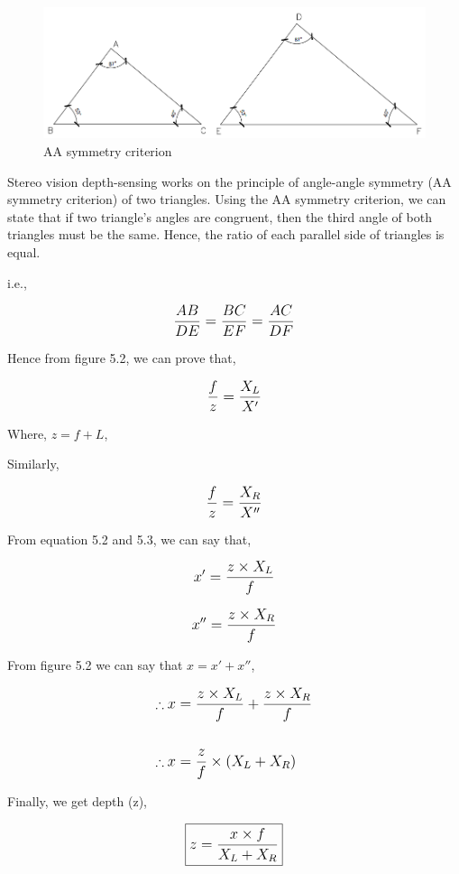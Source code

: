 \documentclass[twocolumn]{report}
\begin{document}
\begin{figure}[ht]
    \centering
    \includegraphics[width=\columnwidth]{aa_criterion.png}
    \caption{AA symmetry criterion}
\end{figure}

Stereo vision depth-sensing works on the principle of angle-angle symmetry (AA symmetry 
criterion) of two triangles. Using the AA symmetry criterion, we can state that if two 
triangle's angles are congruent, then the third angle of both triangles must be the 
same. Hence, the ratio of each parallel side of triangles is equal.

i.e.,

\begin{equation}
    \text{\large$ \frac{AB}{DE} = \frac{BC}{EF} = \frac{AC}{DF} $}
\end{equation}

Hence from figure 5.2, we can prove that,

\begin{equation}
    \text{\large$ \frac{f}{z} = \frac{X_{L}}{X'} $}
\end{equation}

Where, \(z = f + L \),

Similarly,

\begin{equation}
    \text{\large$ \frac{f}{z} = \frac{X_{R}}{X''} $}
\end{equation}

From equation 5.2 and 5.3, we can say that,

\begin{equation}
    \text{\large$ x' = \frac{z \times X_{L}}{f} $}
\end{equation}

\begin{equation}
    \text{\large$ x'' = \frac{z \times X_{R}}{f} $}
\end{equation}

From figure 5.2 we can say that \(x = x' + x'' \),

\begin{align*}
    \therefore{}&\text{\large$ x = \frac{z \times X_{L}}{f} + \frac{z \times X_{R}}{f} $}\\\\
    \therefore{}&\text{\large$ x = \frac{z}{f} \times (X_{L} + X_{R}) $}
\end{align*}

Finally, we get depth (z),

\begin{equation}
    \boxed{\text{\large$ z = \frac{x \times f}{X_{L} + X_{R}} $}}
\end{equation}
\end{document}
